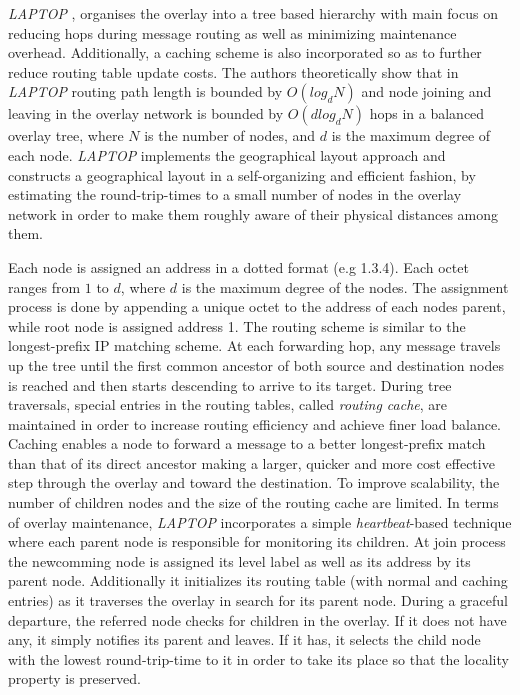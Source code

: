 \documentclass[acmcsur,acmnow]{acmtrans2m}
\begin{document}
\textit{LAPTOP} \cite{wu_laptop_2007},  organises the overlay into a tree based
hierarchy with main focus on reducing hops during message routing as well as
minimizing maintenance overhead. Additionally, a caching scheme is also
incorporated so as to further reduce routing table update costs. The authors
theoretically show that in \textit{LAPTOP} routing path length is bounded by $O(log_d
N)$ and node joining and leaving in the overlay network is bounded by $O\left( d
log_d N \right)$ hops in a balanced overlay tree, where $N$ is the number of
nodes, and $d$ is the maximum degree of each node. \textit{LAPTOP} implements
the geographical layout approach  and constructs a geographical layout in a
self-organizing and efficient fashion, by estimating the round-trip-times to a small number of nodes in the overlay network in order to make them roughly
aware of their physical distances among them.

Each node is assigned an address in a dotted format (e.g 1.3.4). Each octet
ranges from $1$ to $d$, where $d$ is the maximum degree of the nodes. The
assignment process is done by appending a unique octet to the address of each
nodes
parent, while root node is assigned address 1.  The routing scheme is similar to the
longest-prefix IP matching scheme. At each forwarding hop, any message travels
up the tree until the first common ancestor of both source and destination nodes is
reached and then starts descending to arrive to its target. During tree
traversals, special entries in the routing tables, called \emph{routing cache},
are maintained in order to increase routing efficiency and achieve finer load
balance. Caching enables a node to forward a message to a better longest-prefix
match than that of its direct ancestor making a larger, quicker and more cost
effective step through the overlay and toward the destination. To improve
scalability, the number of children nodes and the size of the routing cache are
limited.  In terms of overlay maintenance, \textit{LAPTOP} incorporates a simple
\emph{heartbeat}-based technique where each parent node is responsible for
monitoring its children.  At join process the newcomming node is assigned its
level label as well as its address by its parent node. Additionally it
initializes its routing table (with normal and caching entries) as it traverses
the overlay in search for its parent node.  During a graceful departure, the
referred node checks for children in the overlay. If it does not have any, it
simply notifies its parent and leaves. If it has, it selects the child node with
the lowest round-trip-time to it in order to take its place so that the locality property is
preserved.
\end{document}
